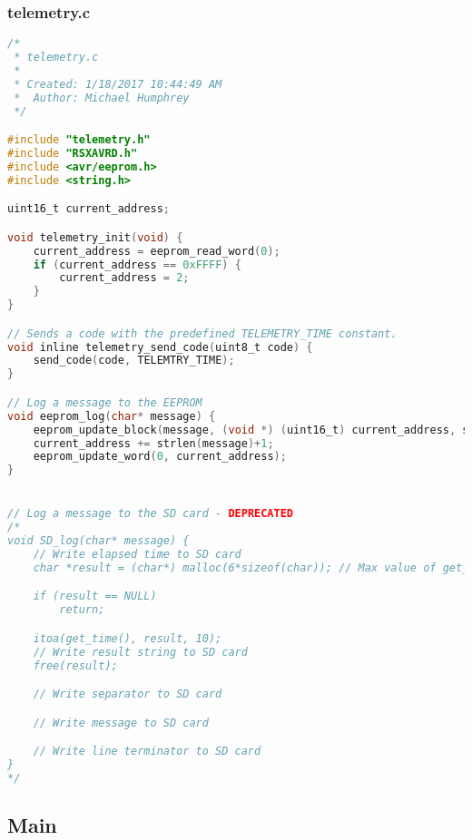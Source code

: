 \subsubsection{telemetry.c}
\begin{lstlisting}[language=C]
/*
 * telemetry.c
 *
 * Created: 1/18/2017 10:44:49 AM
 *  Author: Michael Humphrey
 */ 

#include "telemetry.h"
#include "RSXAVRD.h"
#include <avr/eeprom.h>
#include <string.h>

uint16_t current_address;

void telemetry_init(void) {
	current_address = eeprom_read_word(0);
	if (current_address == 0xFFFF) {
		current_address = 2;
	}
}

// Sends a code with the predefined TELEMETRY_TIME constant.
void inline telemetry_send_code(uint8_t code) {
	send_code(code, TELEMTRY_TIME);
}

// Log a message to the EEPROM
void eeprom_log(char* message) {
	eeprom_update_block(message, (void *) (uint16_t) current_address, strlen(message)+1);
	current_address += strlen(message)+1;
	eeprom_update_word(0, current_address);
}


// Log a message to the SD card - DEPRECATED
/*
void SD_log(char* message) {
	// Write elapsed time to SD card
	char *result = (char*) malloc(6*sizeof(char)); // Max value of get_time() is 65535, which is 5 characters, plus 1 for null terminator

	if (result == NULL)
		return;

	itoa(get_time(), result, 10);
	// Write result string to SD card
	free(result);

	// Write separator to SD card

	// Write message to SD card

	// Write line terminator to SD card
}
*/
\end{lstlisting}

\subsection{Main}
